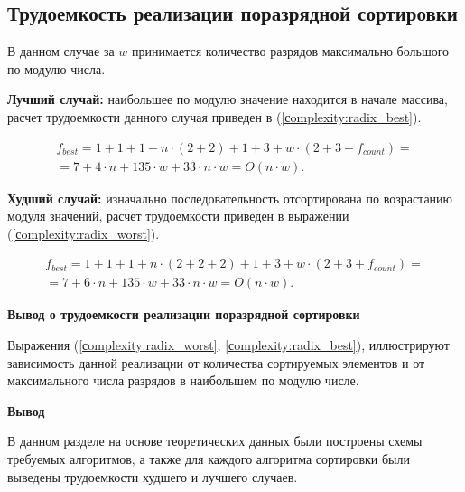 \subsection{Трудоемкость реализации поразрядной сортировки}
В данном случае за $w$ принимается количество разрядов максимально большого по модулю числа.

\textbf{Лучший случай:} наибольшее по модулю значение находится в начале массива, расчет трудоемкости данного случая приведен в (\ref{сomplexity:radix_best}).


\begin{equation}
	\label{сomplexity:radix_best}
	\begin{gathered}
		f_{best} = 1 + 1 + 1 + n \cdot (2 + 2) + 1 +3 + w \cdot (2 + 3 + f_{count}) = \\
		= 7 + 4 \cdot n + 135 \cdot w + 33 \cdot n \cdot w = O(n \cdot w).
	\end{gathered}
\end{equation}


\textbf{Худший случай:} изначально последовательность отсортирована по возрастанию модуля значений, расчет трудоемкости приведен в выражении (\ref{сomplexity:radix_worst}).

\begin{equation}
	\label{сomplexity:radix_worst}
	\begin{gathered}
		f_{best} = 1 + 1 + 1 + n \cdot (2 + 2 + 2) + 1 +3 + w \cdot (2 + 3 + f_{count}) = \\
		= 7 + 6 \cdot n + 135 \cdot w + 33 \cdot n \cdot w = O(n \cdot w).
	\end{gathered}
\end{equation}

\textbf{Вывод о  трудоемкости  реализации поразрядной сортировки}

Выражения (\ref{сomplexity:radix_worst}, \ref{сomplexity:radix_best}), иллюстрируют зависимость данной реализации от количества сортируемых элементов и от максимального числа разрядов в наибольшем по модулю числе.




\textbf{Вывод}

В данном разделе на основе теоретических данных были построены схемы
требуемых алгоритмов, а также для каждого алгоритма сортировки были выведены трудоемкости худшего и лучшего случаев.










